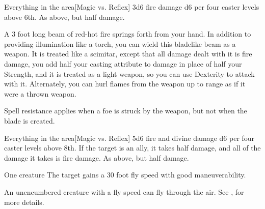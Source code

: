 \begin{spelltargets}{Everything in the area}[Magic vs. Reflex]
    \spellsuccess 3d6 fire damage \add d6 per four caster levels above 6th.
    \spellfailure As above, but half damage.
\end{spelltargets}
\spellnotes \destructivespellnotes

\firespellnotes

\spelldur{\durlong \dismissable}
\spelleffect A 3 foot long beam of red-hot fire springs forth from your hand. In addition to providing illumination like a torch, you can wield this bladelike beam as a weapon. It is treated like a scimitar, except that all damage dealt with it is fire damage, you add half your casting attribute to damage in place of half your Strength, and it is treated as a light weapon, so you can use Dexterity to attack with it. Alternately, you can hurl flames from the weapon up to \rngmed range as if it were a thrown weapon.
\spellnotes \firespellnotes

Spell resistance applies when a foe is struck by the weapon, but not when the blade is created.

\spellrng{\rngclose}
\begin{spelltarget}{Everything in the area}[Magic vs. Reflex]
    \spellsuccess 5d6 fire and divine damage \add d6 per four caster levels above 8th. If the target is an ally, it takes half damage, and all of the damage it takes is fire damage.
    \spellfailure As above, but half damage.
\end{spelltarget}
\spellnotes \destructivespellnotes

\firespellnotes

\spellrng{\rngtouch}
\spelldur{\durshort}
\begin{spelltarget}{One creature}
    \spelleffect The target gains a 30 foot fly speed with good maneuverability.
\end{spelltarget}
\spellnotes An unencumbered creature with a fly speed can fly through the air. See , for more details.

